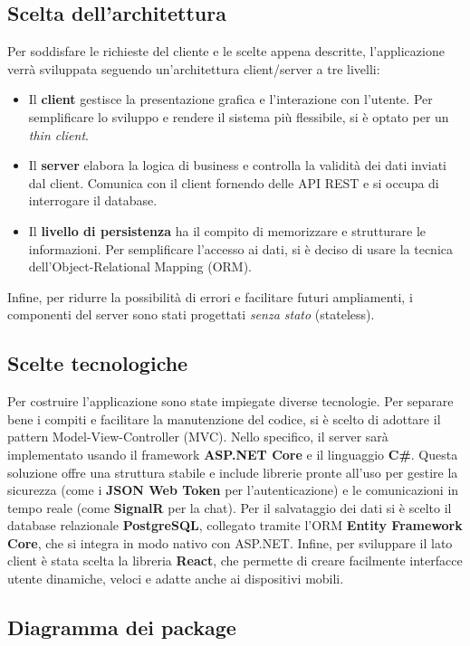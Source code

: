 \documentclass[12pt,a4paper]{report}
\begin{document}
\subsection{Scelta dell'architettura}
Per soddisfare le richieste del cliente e le scelte appena descritte, l'applicazione verrà sviluppata seguendo un'architettura client/server a tre livelli:
\begin{itemize}
    \item Il \textbf{client} gestisce la presentazione grafica e l'interazione con l'utente. Per semplificare lo sviluppo e rendere il sistema più flessibile, si è optato per un \textit{thin client}.
    \item Il \textbf{server} elabora la logica di business e controlla la validità dei dati inviati dal client. Comunica con il client fornendo delle API REST e si occupa di interrogare il database.
    \item Il \textbf{livello di persistenza} ha il compito di memorizzare e strutturare le informazioni. Per semplificare l'accesso ai dati, si è deciso di usare la tecnica dell'Object-Relational Mapping (ORM).
\end{itemize}
Infine, per ridurre la possibilità di errori e facilitare futuri ampliamenti, i componenti del server sono stati progettati \textit{senza stato} (stateless).

\subsection{Scelte tecnologiche}
Per costruire l'applicazione sono state impiegate diverse tecnologie. Per separare bene i compiti e facilitare la manutenzione del codice, si è scelto di adottare il pattern Model-View-Controller (MVC). 
Nello specifico, il server sarà implementato usando il framework \textbf{ASP.NET Core} e il linguaggio \textbf{C\#}. Questa soluzione offre una struttura stabile e include librerie pronte all'uso per gestire la sicurezza (come i \textbf{JSON Web Token} per l'autenticazione) e le comunicazioni in tempo reale (come \textbf{SignalR} per la chat).
Per il salvataggio dei dati si è scelto il database relazionale \textbf{PostgreSQL}, collegato tramite l'ORM \textbf{Entity Framework Core}, che si integra in modo nativo con ASP.NET. 
Infine, per sviluppare il lato client è stata scelta la libreria \textbf{React}, che permette di creare facilmente interfacce utente dinamiche, veloci e adatte anche ai dispositivi mobili.

\subsection{Diagramma dei package}
\end{document}
